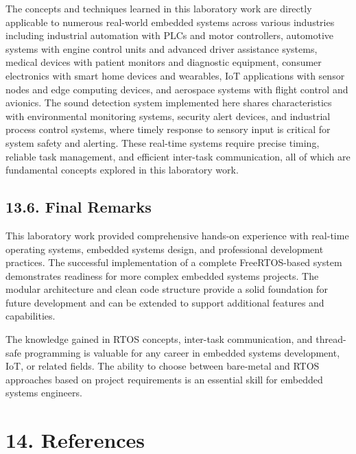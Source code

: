 \documentclass[12pt]{article}
\begin{document}
The concepts and techniques learned in this laboratory work are directly applicable to numerous real-world embedded systems across various industries including industrial automation with PLCs and motor controllers, automotive systems with engine control units and advanced driver assistance systems, medical devices with patient monitors and diagnostic equipment, consumer electronics with smart home devices and wearables, IoT applications with sensor nodes and edge computing devices, and aerospace systems with flight control and avionics. The sound detection system implemented here shares characteristics with environmental monitoring systems, security alert devices, and industrial process control systems, where timely response to sensory input is critical for system safety and alerting. These real-time systems require precise timing, reliable task management, and efficient inter-task communication, all of which are fundamental concepts explored in this laboratory work.

\subsection*{13.6. Final Remarks}

This laboratory work provided comprehensive hands-on experience with real-time operating systems, embedded systems design, and professional development practices. The successful implementation of a complete FreeRTOS-based system demonstrates readiness for more complex embedded systems projects. The modular architecture and clean code structure provide a solid foundation for future development and can be extended to support additional features and capabilities.

The knowledge gained in RTOS concepts, inter-task communication, and thread-safe programming is valuable for any career in embedded systems development, IoT, or related fields. The ability to choose between bare-metal and RTOS approaches based on project requirements is an essential skill for embedded systems engineers.

\section*{14. References}
\end{document}
